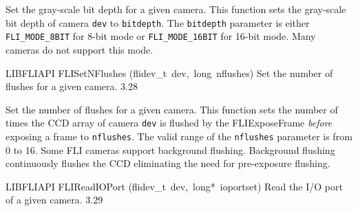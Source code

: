 \documentclass{article}
\begin{document}
\begin{cxxentry}
\begin{cxxfunction}
\begin{cxxdoc}
Set the gray-scale bit depth for a given camera.  This function
sets the gray-scale bit depth of camera \texttt{dev} to
\texttt{bitdepth}.  The \texttt{bitdepth} parameter is either
\texttt{FLI\_MODE\_8BIT} for 8-bit mode or \texttt{FLI\_MODE\_16BIT}
for 16-bit mode. Many cameras do not support this mode.


\end{cxxdoc}
\end{cxxfunction}
\begin{cxxfunction}
{LIBFLIAPI}
        {FLISetNFlushes}
        {(flidev\_t\ dev,\ long\ nflushes)}
        { Set the number of flushes for a given camera.}
        {3.28}
\begin{cxxdoc}

Set the number of flushes for a given camera.  This function sets
the number of times the CCD array of camera \texttt{dev} is flushed by
the FLIExposeFrame \emph{before} exposing a frame
to \texttt{nflushes}.  The valid range of the \texttt{nflushes}
parameter is from 0 to 16. Some FLI cameras support background flushing.
Background flushing continuously flushes the CCD eliminating the need for
pre-exposure flushing.


\end{cxxdoc}
\end{cxxfunction}
\begin{cxxfunction}
{LIBFLIAPI}
        {FLIReadIOPort}
        {(flidev\_t\ dev,\ long*\ ioportset)}
        { Read the I/O port of a given camera.}
        {3.29}
\begin{cxxdoc}


\end{cxxdoc}
\end{cxxfunction}
\end{cxxentry}
\end{document}
